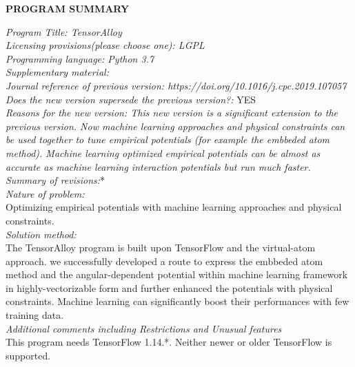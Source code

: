 \documentclass[final,3p,times]{elsarticle}
\begin{document}

{\bf PROGRAM SUMMARY} \\
\begin{small}
\noindent
{\em Program Title: TensorAlloy} \\
{\em Licensing provisions(please choose one): LGPL}             \\
{\em Programming language: Python 3.7}                          \\
{\em Supplementary material:}                                   \\
{\em Journal reference of previous version: 
https://doi.org/10.1016/j.cpc.2019.107057}                      \\
{\em Does the new version supersede the previous version?:} YES \\
{\em Reasons for the new version: This new version is a significant extension to 
the previous version. Now machine learning approaches and physical constraints 
can be used together to tune empirical potentials (for example the embbeded atom 
method). Machine learning optimized empirical potentials can be almost as 
accurate as machine learning interaction potentials but run much faster.} \\
{\em Summary of revisions:}*\\
{\em Nature of problem:} \\
  Optimizing empirical potentials with machine learning approaches and physical 
  constraints. \\
{\em Solution method:} \\
  The TensorAlloy program is built upon TensorFlow and the virtual-atom 
  approach. we successfully developed a route to express the embbeded atom 
  method and the angular-dependent potential within machine learning framework 
  in highly-vectorizable form and further enhanced the potentials with physical
  constraints. Machine learning can significantly boost their performances with 
  few training data.   \\
{\em Additional comments including Restrictions and Unusual features}\\
  This program needs TensorFlow 1.14.*. Neither newer or older TensorFlow is 
  supported. \\
\end{small}


% 
%
\end{document}

